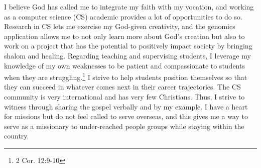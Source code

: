 \documentclass{article}
\begin{document}
I believe God has called me to integrate my faith with my vocation, and working as a computer science (CS) academic provides a lot of opportunities to do so.
Research in CS lets me exercise my God-given creativity, and the genomics application allows me to not only learn more about God's creation but also to work on a project that has the potential to positively impact society by bringing shalom and healing.
Regarding teaching and supervising students, I leverage my knowledge of my own weaknesses to be patient and compassionate to students when they are struggling.\footnote{2 Cor. 12:9-10}
I strive to help students position themselves so that they can succeed in whatever comes next in their career trajectories.
The CS community is very international and has very few Christians.
Thus, I strive to witness through sharing the gospel verbally and by my example.
I have a heart for missions but do not feel called to serve overseas, and this gives me a way to serve as a missionary to under-reached people groups while staying within the country.
\end{document}
